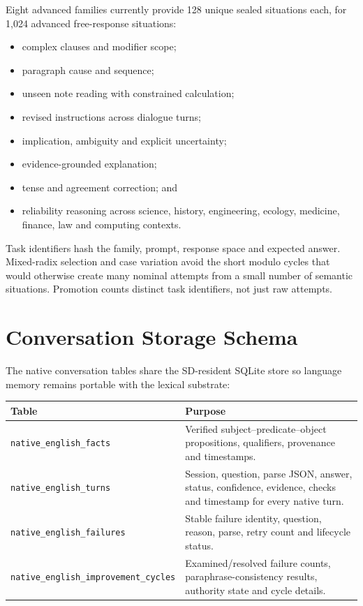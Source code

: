 \documentclass[11pt,a4paper]{article}
\begin{document}
Eight advanced families currently provide 128 unique sealed situations each, for 1,024
advanced free-response situations:

\begin{itemize}
  \item complex clauses and modifier scope;
  \item paragraph cause and sequence;
  \item unseen note reading with constrained calculation;
  \item revised instructions across dialogue turns;
  \item implication, ambiguity and explicit uncertainty;
  \item evidence-grounded explanation;
  \item tense and agreement correction; and
  \item reliability reasoning across science, history, engineering, ecology, medicine,
        finance, law and computing contexts.
\end{itemize}

Task identifiers hash the family, prompt, response space and expected answer. Mixed-radix
selection and case variation avoid the short modulo cycles that would otherwise create many
nominal attempts from a small number of semantic situations. Promotion counts distinct task
identifiers, not just raw attempts.

\section{Conversation Storage Schema}

The native conversation tables share the SD-resident SQLite store so language memory remains
portable with the lexical substrate:

\begin{longtable}{p{} p{}}
\toprule
Table & Purpose \\
\midrule
\endhead
\texttt{native\_english\_facts} & Verified subject--predicate--object propositions,
qualifiers, provenance and timestamps. \\
\texttt{native\_english\_turns} & Session, question, parse JSON, answer, status, confidence,
evidence, checks and timestamp for every native turn. \\
\texttt{native\_english\_failures} & Stable failure identity, question, reason, parse, retry
count and lifecycle status. \\
\texttt{native\_english\_improvement\_cycles} & Examined/resolved failure counts,
paraphrase-consistency results, authority state and cycle details. \\
\bottomrule
\end{longtable}
\end{document}
